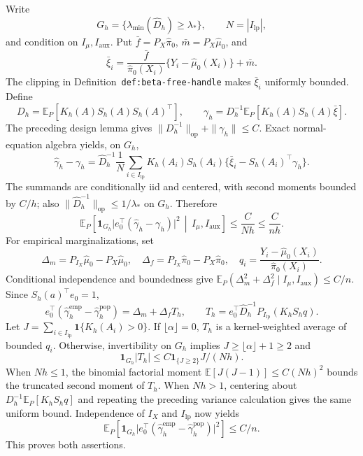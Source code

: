 Write
\[
G_h=\{\lambda_{\min}(\widehat D_h)\ge\lambda_*\},
\qquad N=|I_{\mathrm{lp}}|,
\]
and condition on \(I_\mu,I_{\mathrm{aux}}\). Put \(\bar f=P_X\widehat\pi_0\), \(\bar m=P_X\widehat\mu_0\), and
\[
\bar\xi_i=
\frac{\bar f}{\widehat\pi_0(X_i)}\{Y_i-\widehat\mu_0(X_i)\}+\bar m.
\]
The clipping in Definition~\texttt{def:beta-free-handle} makes \(\bar\xi_i\) uniformly bounded. Define
\[
D_h=\mathbb E_P[K_h(A)S_h(A)S_h(A)^\top],
\qquad
\gamma_h=D_h^{-1}\mathbb E_P[K_h(A)S_h(A)\bar\xi].
\]
The preceding design lemma gives \(\|D_h^{-1}\|_{\mathrm{op}}+\|\gamma_h\|\le C\). Exact normal-equation algebra yields, on \(G_h\),
\[
\widehat\gamma_h-\gamma_h
=
\widehat D_h^{-1}\frac1N\sum_{i\in I_{\mathrm{lp}}}
K_h(A_i)S_h(A_i)\{\bar\xi_i-S_h(A_i)^\top\gamma_h\}.
\]
The summands are conditionally iid and centered, with second moments bounded by \(C/h\); also \(\|\widehat D_h^{-1}\|_{\mathrm{op}}\le1/\lambda_*\) on \(G_h\). Therefore
\[
\mathbb E_P\!\left[
\mathbf1_{G_h}\lvert e_0^\top(\widehat\gamma_h-\gamma_h)\rvert^2
\,\middle|\,I_\mu,I_{\mathrm{aux}}\right]
\le\frac{C}{Nh}\le\frac{C}{nh}.
\]
For empirical marginalizations, set
\[
\Delta_m=P_{I_X}\widehat\mu_0-P_X\widehat\mu_0,
\quad
\Delta_f=P_{I_X}\widehat\pi_0-P_X\widehat\pi_0,
\quad
q_i=\frac{Y_i-\widehat\mu_0(X_i)}{\widehat\pi_0(X_i)}.
\]
Conditional independence and boundedness give \(\mathbb E_P(\Delta_m^2+\Delta_f^2\mid I_\mu,I_{\mathrm{aux}})\le C/n\). Since \(S_h(a)^\top e_0=1\),
\[
e_0^\top(\widehat\gamma_h^{\mathrm{emp}}-\widehat\gamma_h^{\mathrm{pop}})
=
\Delta_m+\Delta_fT_h,
\qquad
T_h=e_0^\top\widehat D_h^{-1}P_{I_{\mathrm{lp}}}(K_hS_hq).
\]
Let \(J=\sum_{i\in I_{\mathrm{lp}}}\mathbf1\{K_h(A_i)>0\}\). If \(\lfloor\alpha\rfloor=0\), \(T_h\) is a kernel-weighted average of bounded \(q_i\). Otherwise, invertibility on \(G_h\) implies \(J\ge\lfloor\alpha\rfloor+1\ge2\) and
\[
\mathbf1_{G_h}|T_h|\le C\mathbf1_{\{J\ge2\}}J/(Nh).
\]
When \(Nh\le1\), the binomial factorial moment \(\mathbb E[J(J-1)]\le C(Nh)^2\) bounds the truncated second moment of \(T_h\). When \(Nh>1\), centering about \(D_h^{-1}\mathbb E_P[K_hS_hq]\) and repeating the preceding variance calculation gives the same uniform bound. Independence of \(I_X\) and \(I_{\mathrm{lp}}\) now yields
\[
\mathbb E_P\!\left[
\mathbf1_{G_h}\lvert e_0^\top(\widehat\gamma_h^{\mathrm{emp}}-
\widehat\gamma_h^{\mathrm{pop}})\rvert^2\right]
\le C/n.
\]
This proves both assertions.